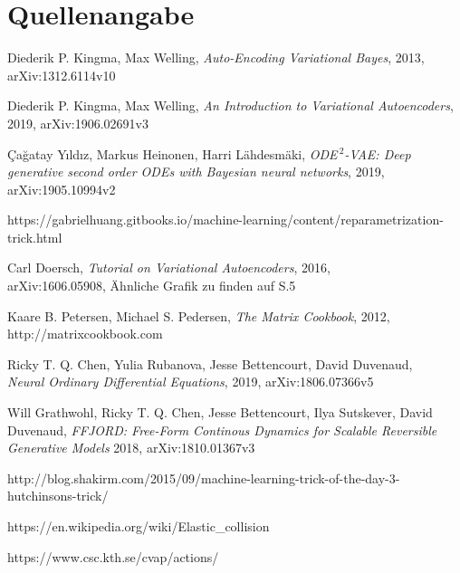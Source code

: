 \documentclass[12pt]{article}
\begin{document}
	\section[Quellenangabe]{Quellenangabe}
	\begin{thebibliography}{9}
		Diederik P. Kingma, Max Welling,
		\textit{Auto-Encoding Variational Bayes},
		2013,\\
		arXiv:1312.6114v10

		Diederik P. Kingma, Max Welling,
		\textit{An Introduction to Variational Autoencoders},
		2019,
		arXiv:1906.02691v3

		Çağatay Yıldız, Markus Heinonen, Harri Lähdesmäki,
		\textit{ODE$^{\ 2}$-VAE: Deep generative second order ODEs with Bayesian neural networks},
		2019,
		arXiv:1905.10994v2

		https://gabrielhuang.gitbooks.io/machine-learning/content/reparametrization-trick.html

		Carl Doersch,
		\textit{Tutorial on Variational Autoencoders},
		2016,\\
		arXiv:1606.05908,
		Ähnliche Grafik zu finden auf S.5

		Kaare B. Petersen, Michael S. Pedersen,
		\textit{The Matrix Cookbook},
		2012,
		http://matrixcookbook.com%

		Ricky T. Q. Chen, Yulia Rubanova, Jesse Bettencourt, David Duvenaud,\\
		\textit{Neural Ordinary Differential Equations},
		2019, arXiv:1806.07366v5

		Will Grathwohl, Ricky T. Q. Chen, Jesse Bettencourt, Ilya Sutskever, David Duvenaud,
		\textit{FFJORD:  Free-Form Continous Dynamics for Scalable Reversible Generative Models}
		2018, arXiv:1810.01367v3

		http://blog.shakirm.com/2015/09/machine-learning-trick-of-the-day-3-hutchinsons-trick/
		
		https://en.wikipedia.org/wiki/Elastic\_collision
		
		https://www.csc.kth.se/cvap/actions/
	\end{thebibliography}
\end{document}
